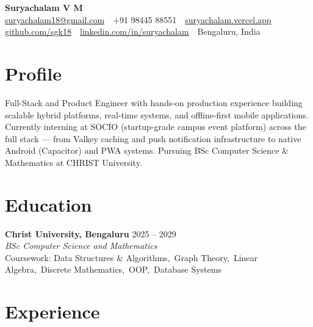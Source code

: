 \documentclass[10pt,a4paper]{article}
\begin{document}
\pagestyle{empty}

\begin{center}
  {\LARGE\bfseries Suryachalam V M}\\[3pt]
  \small
  \href{mailto:suryachalam18@gmail.com}{suryachalam18@gmail.com}
  \,\textbar\,
  +91 98445 88551
  \,\textbar\,
  \href{https://suryachalam.vercel.app}{suryachalam.vercel.app}
  \,\textbar\,
  \href{https://github.com/sgk18}{github.com/sgk18}
  \,\textbar\,
  \href{https://www.linkedin.com/in/suryachalam}{linkedin.com/in/suryachalam}
  \,\textbar\,
  Bengaluru, India
\end{center}

\vspace{-2pt}

\section*{Profile}
Full-Stack and Product Engineer with hands-on production experience building scalable hybrid
platforms, real-time systems, and offline-first mobile applications. Currently interning at
SOCIO (startup-grade campus event platform) across the full stack — from Valkey caching and
push notification infrastructure to native Android (Capacitor) and PWA systems. Pursuing BSc
Computer Science \& Mathematics at CHRIST University.

\section*{Education}
\noindent\textbf{Christ University, Bengaluru} \hfill 2025 -- 2029\\[-3pt]
\noindent\textit{BSc Computer Science and Mathematics}\\[-3pt]
\noindent\small Coursework: Data Structures \& Algorithms,\ Graph Theory,\ Linear Algebra,\
Discrete Mathematics,\ OOP,\ Database Systems

\section*{Experience}
\end{document}
